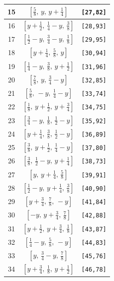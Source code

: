 \documentclass[fleqn,8pt]{jsarticle}
\begin{document}
\begin{longtable}{ccc}
15 & $\left[ \frac{5}{8},\, y,\, y + \frac{1}{4} \right]$ & {\tt [27,82]} \\ \hline
16 & $\left[ y + \frac{1}{2},\, \frac{1}{4} - y,\, \frac{3}{8} \right]$ & {\tt [28,93]} \\ \hline
17 & $\left[ \frac{1}{2} - y,\, \frac{3}{4} - y,\, \frac{1}{8} \right]$ & {\tt [29,95]} \\ \hline
18 & $\left[ y + \frac{1}{4},\, \frac{5}{8},\, y \right]$ & {\tt [30,94]} \\ \hline
19 & $\left[ \frac{1}{4} - y,\, \frac{3}{8},\, y + \frac{1}{2} \right]$ & {\tt [31,96]} \\ \hline
20 & $\left[ \frac{7}{8},\, y,\, \frac{3}{4} - y \right]$ & {\tt [32,85]} \\ \hline
21 & $\left[ \frac{5}{8},\, - y,\, \frac{1}{4} - y \right]$ & {\tt [33,74]} \\ \hline
22 & $\left[ \frac{1}{8},\, y + \frac{1}{2},\, y + \frac{3}{4} \right]$ & {\tt [34,75]} \\ \hline
23 & $\left[ \frac{3}{4} - y,\, \frac{1}{8},\, \frac{1}{2} - y \right]$ & {\tt [35,92]} \\ \hline
24 & $\left[ y + \frac{1}{4},\, \frac{3}{8},\, \frac{1}{2} - y \right]$ & {\tt [36,89]} \\ \hline
25 & $\left[ \frac{3}{8},\, y + \frac{1}{2},\, \frac{1}{4} - y \right]$ & {\tt [37,80]} \\ \hline
26 & $\left[ \frac{3}{8},\, \frac{1}{2} - y,\, y + \frac{1}{4} \right]$ & {\tt [38,73]} \\ \hline
27 & $\left[ y,\, y + \frac{1}{4},\, \frac{5}{8} \right]$ & {\tt [39,91]} \\ \hline
28 & $\left[ \frac{1}{2} - y,\, y + \frac{1}{4},\, \frac{3}{8} \right]$ & {\tt [40,90]} \\ \hline
29 & $\left[ y + \frac{3}{4},\, \frac{7}{8},\, - y \right]$ & {\tt [41,84]} \\ \hline
30 & $\left[ - y,\, y + \frac{3}{4},\, \frac{7}{8} \right]$ & {\tt [42,88]} \\ \hline
31 & $\left[ y + \frac{1}{2},\, y + \frac{3}{4},\, \frac{1}{8} \right]$ & {\tt [43,87]} \\ \hline
32 & $\left[ \frac{1}{4} - y,\, \frac{5}{8},\, - y \right]$ & {\tt [44,83]} \\ \hline
33 & $\left[ y,\, \frac{3}{4} - y,\, \frac{7}{8} \right]$ & {\tt [45,76]} \\ \hline
34 & $\left[ y + \frac{3}{4},\, \frac{1}{8},\, y + \frac{1}{2} \right]$ & {\tt [46,78]} \\ \hline

\end{longtable}
\end{document}

